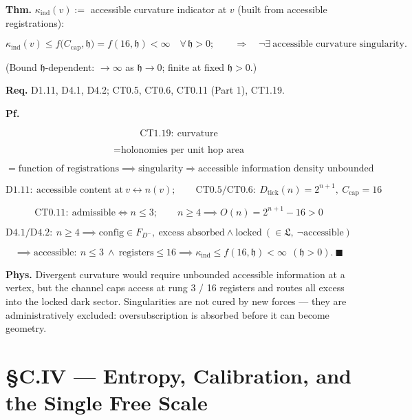 \begin{theorem}\label{tag:CT1-28}
\textbf{Thm.} $\kappa_{\mathrm{ind}}(v):=$ accessible curvature indicator at $v$ (built from accessible registrations):

\[
\kappa_{\mathrm{ind}}(v)\le f\bigl(C_{\mathrm{cap}},\mathfrak h\bigr)=f(16,\mathfrak h)<\infty\quad\forall\,\mathfrak h>0;
\qquad\Longrightarrow\quad\neg\exists\ \text{accessible curvature singularity}.
\]

(Bound $\mathfrak h$-dependent: $\to\infty$ as $\mathfrak h\to0$; finite at fixed $\mathfrak h>0$.)

\textbf{Req.} D1.11, D4.1, D4.2; CT0.5, CT0.6, CT0.11 (Part 1), CT1.19.

\textbf{Pf.}

\[
\mathrm{CT1.19}:\ \text{curvature}
\]

\[
= \text{holonomies per unit hop area}
\]

\[
= \text{function of registrations}\implies\text{singularity}\Rightarrow\text{accessible information density unbounded}
\]

\[
\mathrm{D1.11}:\ \text{accessible content at}\ v\leftrightarrow n(v);\qquad
\mathrm{CT0.5}/\mathrm{CT0.6}:\ D_{\mathrm{tick}}(n)=2^{n+1},\ C_{\mathrm{cap}}=16
\]

\[
\mathrm{CT0.11}:\ \text{admissible}\iff n\le3;\qquad n\ge4\implies O(n)=2^{n+1}-16>0
\]

\[
\mathrm{D4.1}/\mathrm{D4.2}:\ n\ge4\implies\text{config}\in F_{D^-},\ \text{excess absorbed}\wedge\text{locked}\ (\in\mathfrak L,\ \neg\text{accessible})
\]

\[
\implies\text{accessible}:\ n\le3\ \wedge\ \text{registers}\le16\implies\kappa_{\mathrm{ind}}\le f(16,\mathfrak h)<\infty\ \ (\mathfrak h>0).\ \blacksquare
\]

\textbf{Phys.} Divergent curvature would require unbounded accessible information at a vertex, but the channel caps access at rung 3 / 16 registers and routes all excess into the locked dark sector. Singularities are not cured by new forces — they are administratively excluded: oversubscription is absorbed before it can become geometry.

\end{theorem}

\section[§C.IV — Entropy, Calibration, and the Single Free Scale]{\texorpdfstring{§C.IV — Entropy, Calibration, and the Single Free Scale}{SC.IV - Entropy, Calibration, and the Single Free Scale}}

